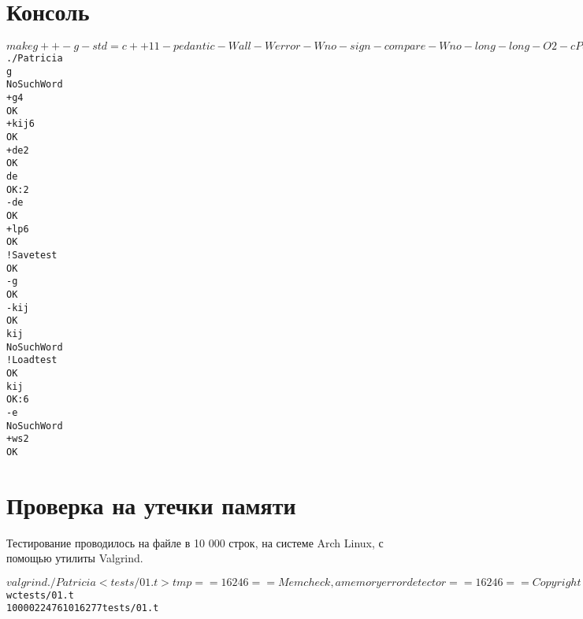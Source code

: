 \documentclass[pdf, unicode, 12pt, a4paper,oneside,fleqn]{article}
\begin{document}
\section{Консоль}
\lstset{language=Bash}
\begin{alltt}
$ make
g++ -g -std=c++11 -pedantic -Wall -Werror -Wno-sign-compare -Wno-long-long -O2 
-c PatriciaTree.cpp
g++ -g -std=c++11 -pedantic -Wall -Werror -Wno-sign-compare -Wno-long-long -O2 
-c main.cpp
g++ -g -std=c++11 -pedantic -Wall -Werror -Wno-sign-compare -Wno-long-long -O2 
-o Patricia PatriciaTree.o main.o -lm
$ ./Patricia
g   
NoSuchWord
+ g 4
OK
+ kij 6
OK
+ de 2
OK
de
OK: 2
- de
OK
+ lp 6
OK
! Save test
OK
- g
OK
- kij
OK
kij
NoSuchWord
! Load test
OK
kij 
OK: 6
- e
NoSuchWord
+ ws 2
OK
\end{alltt}
\newpage
\section{Проверка на утечки памяти }
Тестирование проводилось на файле в 10 000 строк, на системе Arch Linux, с помощью утилиты Valgrind.

\begin{alltt}
$ valgrind ./Patricia < tests/01.t > tmp
==16246== Memcheck, a memory error detector
==16246== Copyright (C) 2002-2017, and GNU GPL'd, by Julian Seward et al.
==16246== Using Valgrind-3.13.0 and LibVEX; rerun with -h for copyright info
==16246== Command: ./Patricia
==16246== 
==16246== 
==16246== HEAP SUMMARY:
==16246==     in use at exit: 0 bytes in 0 blocks
==16246==   total heap usage: 3,362,528 allocs, 3,362,528 frees, 235,824,982 bytes allocated
==16246== 
==16246== All heap blocks were freed -- no leaks are possible
==16246== 
==16246== For counts of detected and suppressed errors, rerun with: -v
==16246== ERROR SUMMARY: 0 errors from 0 contexts (suppressed: 0 from 0)
$ wc tests/01.t
  10000   22476 1016277 tests/01.t
\end{alltt}
\pagebreak
\end{document}
